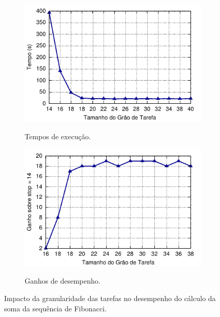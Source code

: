 \documentclass{SBCbookchapter}
\begin{document}
		\begin{figure}[t]
			\captionsetup[subfigure]{justification=centering}
			\centering
				\begin{subfigure}{0.47\linewidth}
					\includegraphics[width=\linewidth]{img/fibonacci-task-grain}
					\label{fig:grao-tarefas-tempo}
					\caption{Tempos de execução.}
				\end{subfigure}
				\quad
				\begin{subfigure}{0.47\linewidth}
					\includegraphics[width=\linewidth]{img/fibonacci-speedup}
					\label{fig:grao-tarefas-ganho}
					\caption{Ganhos de desempenho.}
				\end{subfigure}
			\caption{Impacto da granularidade das tarefas no desempenho do cálculo da soma da sequência
				de Fibonacci.}
			\label{fig:grao-tarefas}
		\end{figure}
\end{document}
